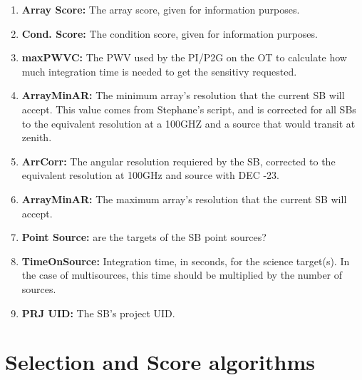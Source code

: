 \documentclass[a4paper,10pt,english]{sphinxmanual}
\begin{document}
\begin{enumerate}
\item {} 
\textbf{Array Score:} The array score, given for information purposes.

\item {} 
\textbf{Cond. Score:} The condition score, given for information purposes.

\item {} 
\textbf{maxPWVC:} The PWV used by the PI/P2G on the OT to calculate how much
integration time is needed to get the sensitivy requested.

\item {} 
\textbf{ArrayMinAR:} The minimum array's resolution that the current SB will
accept. This value comes from Stephane's script, and is corrected for all SBs
to the equivalent resolution at a 100GHZ and a source that would transit at
zenith.

\item {} 
\textbf{ArrCorr:} The angular resolution requiered by the SB, corrected to the
equivalent resolution at 100GHz and source with DEC -23.

\item {} 
\textbf{ArrayMinAR:} The maximum array's resolution that the current SB will
accept.

\item {} 
\textbf{Point Source:} are the targets of the SB point sources?

\item {} 
\textbf{TimeOnSource:} Integration time, in seconds, for the science target(s).
In the case of multisources, this time should be multiplied by the number of
sources.

\item {} 
\textbf{PRJ UID:} The SB's project UID.

\end{enumerate}


\chapter{Selection and Score algorithms}
\label{algorithm:selection-and-score-algorithms}\label{algorithm::doc}
\end{document}
